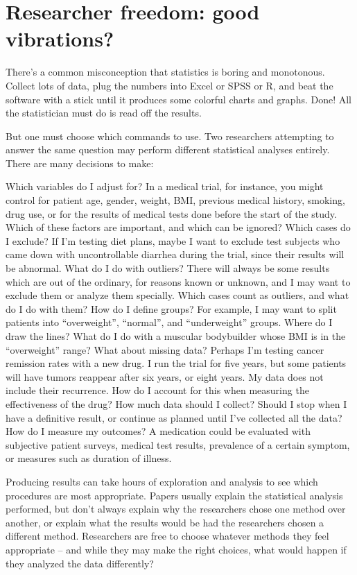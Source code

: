 \chapter{Researcher freedom: good vibrations?}
\label{chp8}

There’s a common misconception that statistics is boring and monotonous. Collect lots of data, plug the numbers into Excel or SPSS or R, and beat the software with a stick until it produces some colorful charts and graphs. Done! All the statistician must do is read off the results.

But one must choose which commands to use. Two researchers attempting to answer the same question may perform different statistical analyses entirely. There are many decisions to make:

    Which variables do I adjust for? In a medical trial, for instance, you might control for patient age, gender, weight, BMI, previous medical history, smoking, drug use, or for the results of medical tests done before the start of the study. Which of these factors are important, and which can be ignored?
    Which cases do I exclude? If I’m testing diet plans, maybe I want to exclude test subjects who came down with uncontrollable diarrhea during the trial, since their results will be abnormal.
    What do I do with outliers? There will always be some results which are out of the ordinary, for reasons known or unknown, and I may want to exclude them or analyze them specially. Which cases count as outliers, and what do I do with them?
    How do I define groups? For example, I may want to split patients into “overweight”, “normal”, and “underweight” groups. Where do I draw the lines? What do I do with a muscular bodybuilder whose BMI is in the “overweight” range?
    What about missing data? Perhaps I’m testing cancer remission rates with a new drug. I run the trial for five years, but some patients will have tumors reappear after six years, or eight years. My data does not include their recurrence. How do I account for this when measuring the effectiveness of the drug?
    How much data should I collect? Should I stop when I have a definitive result, or continue as planned until I’ve collected all the data?
    How do I measure my outcomes? A medication could be evaluated with subjective patient surveys, medical test results, prevalence of a certain symptom, or measures such as duration of illness.

Producing results can take hours of exploration and analysis to see which procedures are most appropriate. Papers usually explain the statistical analysis performed, but don’t always explain why the researchers chose one method over another, or explain what the results would be had the researchers chosen a different method. Researchers are free to choose whatever methods they feel appropriate – and while they may make the right choices, what would happen if they analyzed the data differently?

